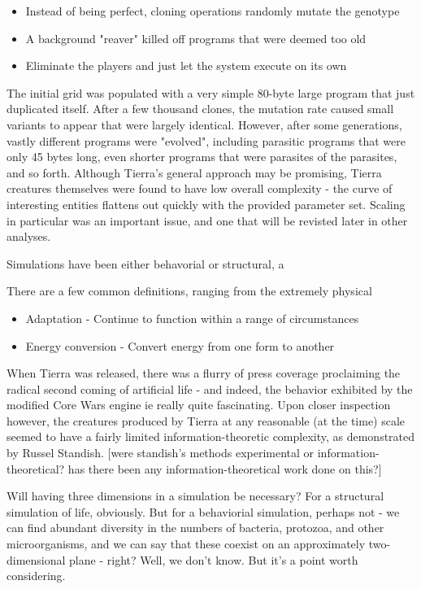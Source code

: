 \documentclass{article}
\begin{document}
\begin{itemize}
\item Instead of being perfect, cloning operations randomly mutate the genotype
\item A background "reaver" killed off programs that were deemed too old
\item Eliminate the players and just let the system execute on its own
\end{itemize}

The initial grid was populated with a very simple 80-byte large program that just duplicated itself. After a few thousand clones, the mutation rate caused small variants to appear that were largely identical. However, after some generations, vastly different programs were "evolved", including parasitic programs that were only 45 bytes long, even shorter programs that were parasites of the parasites, and so forth. Although Tierra's general approach may be promising, Tierra creatures themselves were found to have low overall complexity - the curve of interesting entities flattens out quickly with the provided parameter set. Scaling in particular was an important issue, and one that will be revisted later in other analyses.



Simulations have been either behavorial or structural, a

There are a few common definitions, ranging from the extremely physical

\begin{itemize}
\item Adaptation - Continue to function within a range of circumstances
\item Energy conversion - Convert energy from one form to another
\end{itemize}
	
When Tierra was released, there was a flurry of press coverage proclaiming the radical second coming of artificial life - and indeed, the behavior exhibited by the modified Core Wars engine ie really quite fascinating. Upon closer inspection however, the creatures produced by Tierra at any reasonable (at the time) scale seemed to have a fairly limited information-theoretic complexity, as demonstrated by  Russel Standish. [were standish's methods experimental or information-theoretical? has there been any information-theoretical work done on this?]


Will having three dimensions in a simulation be necessary? For a structural simulation of life, obviously. But for a behaviorial simulation, perhaps not - we can find abundant diversity in the numbers of bacteria, protozoa, and other microorganisms, and we can say that these coexist on an approximately two-dimensional plane - right? Well, we don't know. But it's a point worth considering.
\end{document}
